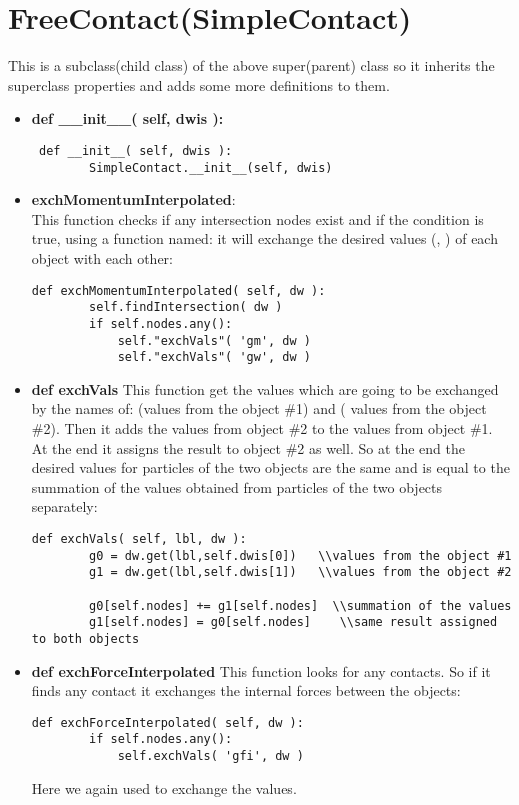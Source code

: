 \section{FreeContact(SimpleContact)}
This is a subclass(child class) of the above super(parent) class so it inherits the superclass properties and adds some more definitions to them.
\begin{itemize}
\item \textbf{def \_\_init\_\_( self, dwis ):}\\
\begin{lstlisting}
 def __init__( self, dwis ):
        SimpleContact.__init__(self, dwis)
\end{lstlisting}
\item \textbf{exchMomentumInterpolated}:\\
This function checks if any intersection nodes exist and if the condition is true, using a function named:  it will exchange the desired values (, ) of each object with each other:
\begin{lstlisting}
def exchMomentumInterpolated( self, dw ):
        self.findIntersection( dw )
        if self.nodes.any():
            self."exchVals"( 'gm', dw )
            self."exchVals"( 'gw', dw )
\end{lstlisting}
\item \textbf{def exchVals}
This function get the values which are going to be exchanged by the names of:  (values from the object \#1) and ( values from the object \#2). Then it adds the values from object \#2 to the values from object \#1. At the end it assigns the result to object \#2 as well. So at the end the desired values for particles of the two objects are the same and is equal to the summation of the values obtained from particles of the two objects separately:
\begin{lstlisting}
def exchVals( self, lbl, dw ):
        g0 = dw.get(lbl,self.dwis[0])   \\values from the object #1
        g1 = dw.get(lbl,self.dwis[1])   \\values from the object #2
       
        g0[self.nodes] += g1[self.nodes]  \\summation of the values
        g1[self.nodes] = g0[self.nodes]    \\same result assigned to both objects
\end{lstlisting}
\item \textbf{def exchForceInterpolated}
This function looks for any contacts. So if it finds any contact it exchanges the internal forces between the objects:
\begin{lstlisting}
def exchForceInterpolated( self, dw ):
        if self.nodes.any():
            self.exchVals( 'gfi', dw )
\end{lstlisting}
Here we again used  to exchange the values. 
\end{itemize}
